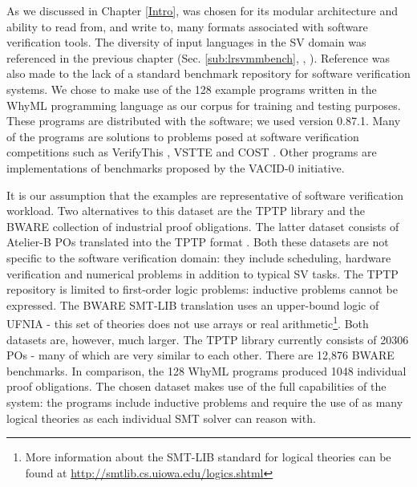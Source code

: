 As we discussed in Chapter \ref{Intro}, \why was chosen for its modular architecture and ability to read from, and write to, many formats associated with software verification tools. The diversity of input languages in the SV domain was referenced in the previous chapter (Sec. \ref{sub:lrsvmmbench}, \cite{Dagstuhl}, \cite{deductiveSV}). %
%
Reference was also made to the lack of a standard benchmark repository for software verification systems. We chose to make use of the 128 example programs written in the WhyML programming language as our corpus for training and testing purposes. These programs are distributed with the \why software; we used version 0.87.1. Many of the programs are solutions to problems posed at software verification competitions such as VerifyThis \cite{verifythis}, VSTTE \cite{Klebanov2011} and COST \cite{bormer:hal-00789525}. Other programs are implementations of benchmarks proposed by the VACID-0 \cite{Leino10vacid-0:verification} initiative.   

It is our assumption that the \why examples are representative of software verification workload. Two alternatives to this dataset are the TPTP \cite{TPTP} library and the BWARE \cite{Delahaye2014} collection of industrial proof obligations. The latter dataset consists of Atelier-B  POs translated into the TPTP format \cite{atelierB2w}. Both these datasets are not specific to the software verification domain: they include scheduling, hardware verification and numerical problems in addition to typical SV tasks. The TPTP repository is limited to first-order logic problems: inductive problems cannot be expressed. The BWARE SMT-LIB translation uses an upper-bound logic of UFNIA - this set of theories does not use arrays or real arithmetic\footnote{More information about the SMT-LIB standard for logical theories can be found at \url{http://smtlib.cs.uiowa.edu/logics.shtml} }. Both datasets are, however, much larger. The TPTP library currently consists of 20306 POs \cite{TPTPsite} - many of which are very similar to each other. There are 12,876 BWARE benchmarks. In comparison, the 128 WhyML programs produced 1048 individual proof obligations. The chosen dataset makes use of the full capabilities of the \why system: the programs include inductive problems and require the use of as many logical theories as each individual SMT solver can reason with.   

